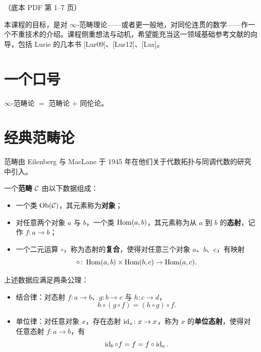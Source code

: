 \begin{center}\small\color{black!55}（底本 PDF 第 1–7 页）\end{center}

本课程的目标，是对 $\infty$-范畴理论——或者更一般地，对同伦连贯的数学——作一个不重技术的介绍。课程侧重想法与动机，希望能充当这一领域基础参考文献的向导，包括 Lurie 的几本书 [Lur09]、[Lur12]、[Lur]。

\section{一个口号}

\begin{slogan}\label{L1-1.1}\centering\par
$\infty$-范畴论 $=$ 范畴论 $+$ 同伦论。
\end{slogan}

\section{经典范畴论}

\nitem\label{L1-2.1} 范畴由 Eilenberg 与 MacLane 于 1945 年在他们关于代数拓扑与同调代数的研究中引入。

\begin{definition}\label{L1-2.2}
一个\textbf{范畴} $\mathcal{C}$ 由以下数据组成：
\begin{itemize}[leftmargin=2.2em,itemsep=0.1em]
\item 一个类 $\operatorname{Ob}(\mathcal{C})$，其元素称为\textbf{对象}；
\item 对任意两个对象 $a$ 与 $b$，一个类 $\operatorname{Hom}(a,b)$，其元素称为从 $a$ 到 $b$ 的\textbf{态射}，记作 $f\colon a\to b$；
\item 一个二元运算 $\circ$，称为态射的\textbf{复合}，使得对任意三个对象 $a$、$b$、$c$，有映射
\[
\circ\colon \operatorname{Hom}(a,b)\times\operatorname{Hom}(b,c)\to \operatorname{Hom}(a,c).
\]
\end{itemize}
上述数据应满足两条公理：
\begin{itemize}[leftmargin=2.2em,itemsep=0.1em]
\item 结合律：对态射 $f\colon a\to b$、$g\colon b\to c$ 与 $h\colon c\to d$，
\[
h\circ(g\circ f)=(h\circ g)\circ f.
\]
\item 单位律：对任意对象 $x$，存在态射 $\operatorname{id}_x\colon x\to x$，称为 $x$ 的\textbf{单位态射}，使得对任意态射 $f\colon a\to b$，有
\[
\operatorname{id}_b\circ f=f=f\circ \operatorname{id}_a.
\]
\end{itemize}
\end{definition}

